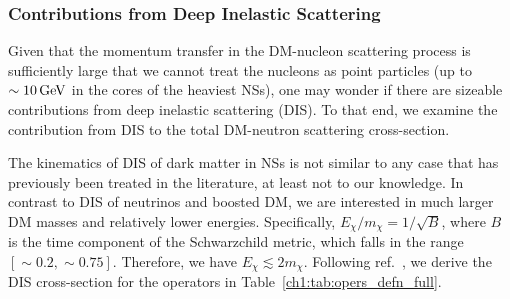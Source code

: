 \subsubsection{Contributions from Deep Inelastic Scattering}
\label{ch5:subsubsec:DIS}
Given that the momentum transfer in the DM-nucleon scattering process is sufficiently large that we cannot treat the nucleons as point particles (up to $\sim 10{\rm \,GeV}$ in the cores of the heaviest NSs), one may wonder if there are sizeable contributions from deep inelastic scattering (DIS). To that end, we examine the contribution from DIS to the total DM-neutron scattering cross-section. 

The kinematics of DIS of dark matter in NSs is not similar to any case that has previously been treated in the literature, at least not to our knowledge. In contrast to DIS of neutrinos and boosted DM, we are interested in much larger DM masses and relatively lower energies.  Specifically, $E_\chi/m_\chi=1/\sqrt{B}$, where $B$ is the time component of the Schwarzchild metric, which falls in the range $[\sim0.2,\sim0.75]$.  Therefore, we have  $E_\chi\lesssim 2m_\chi$. Following ref.~\cite{Agashe:2014yua_Directdetectionboosted}, we derive the DIS cross-section for the operators in Table~\ref{ch1:tab:opers_defn_full}. 


